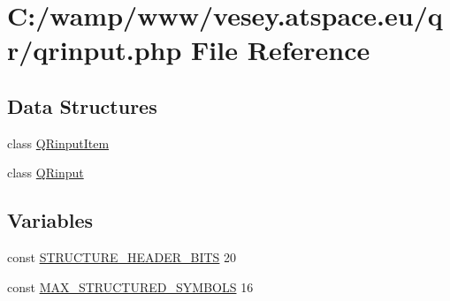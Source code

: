 \hypertarget{qrinput_8php}{\section{C\-:/wamp/www/vesey.atspace.\-eu/qr/qrinput.php File Reference}
\label{qrinput_8php}
}
\subsection*{Data Structures}
\begin{DoxyCompactItemize}
\item 
class \hyperlink{class_q_rinput_item}{Q\-Rinput\-Item}
\item 
class \hyperlink{class_q_rinput}{Q\-Rinput}
\end{DoxyCompactItemize}
\subsection*{Variables}
\begin{DoxyCompactItemize}
\item 
const \hyperlink{qrinput_8php_a58f753d7bd773c7fc06dd729bac7eea8}{S\-T\-R\-U\-C\-T\-U\-R\-E\-\_\-\-H\-E\-A\-D\-E\-R\-\_\-\-B\-I\-T\-S} 20
\item 
const \hyperlink{qrinput_8php_ac138fe0ee629c9a3ddeac1d58c3d623c}{M\-A\-X\-\_\-\-S\-T\-R\-U\-C\-T\-U\-R\-E\-D\-\_\-\-S\-Y\-M\-B\-O\-L\-S} 16
\end{DoxyCompactItemize}


